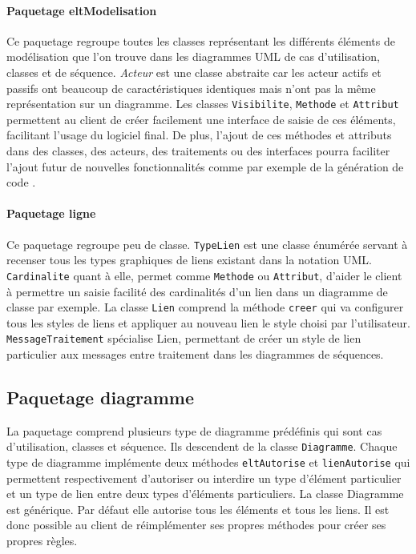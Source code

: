 \documentclass[12pt,a4paper,oneside]{book}
\begin{document}
	\paragraph{Paquetage eltModelisation} Ce paquetage regroupe toutes les classes représentant les différents éléments de 
	modélisation que l'on trouve dans les diagrammes UML de cas d'utilisation, classes et de séquence. \textit{Acteur} 
	est une classe abstraite car les acteur actifs et passifs ont beaucoup de caractéristiques identiques mais n'ont pas 
	la même représentation sur un diagramme. Les classes \texttt{Visibilite}, \texttt{Methode} et \texttt{Attribut} permettent au client de créer 
	facilement une interface de saisie de ces éléments, facilitant l'usage du logiciel final. De plus, l'ajout de ces 
	méthodes et attributs dans des classes, des acteurs, des traitements ou des interfaces pourra faciliter l'ajout futur 
	de nouvelles fonctionnalités comme par exemple de la génération de code .
	\paragraph{Paquetage ligne} Ce paquetage regroupe peu de classe. \texttt{TypeLien} est une classe énumérée servant à recenser
	tous les types graphiques de liens existant dans la notation UML. \texttt{Cardinalite} quant à elle, permet comme \texttt{Methode} 
	ou \texttt{Attribut}, d'aider le client à permettre un saisie facilité des cardinalités d'un lien dans un diagramme de classe par exemple.
	La classe \texttt{Lien} comprend la méthode \texttt{creer} qui va configurer tous les styles de liens et appliquer au nouveau lien
	le style choisi par l'utilisateur. \texttt{MessageTraitement} spécialise Lien, permettant de créer un style de lien particulier
	aux messages entre traitement dans les diagrammes de séquences.
	\subsection{Paquetage diagramme}
	La paquetage  comprend plusieurs type de diagramme prédéfinis qui sont cas d'utilisation, classes et séquence.
	Ils descendent de la classe \texttt{Diagramme}. Chaque type de diagramme implémente deux méthodes \texttt{eltAutorise} et \texttt{lienAutorise}
	qui permettent respectivement d'autoriser ou interdire un type d'élément particulier et un type de lien entre deux types d'éléments
	particuliers. La classe Diagramme est générique. Par défaut elle autorise tous les éléments et tous les liens. Il est donc possible
	au client de réimplémenter ses propres méthodes pour créer ses propres règles.
\end{document}
